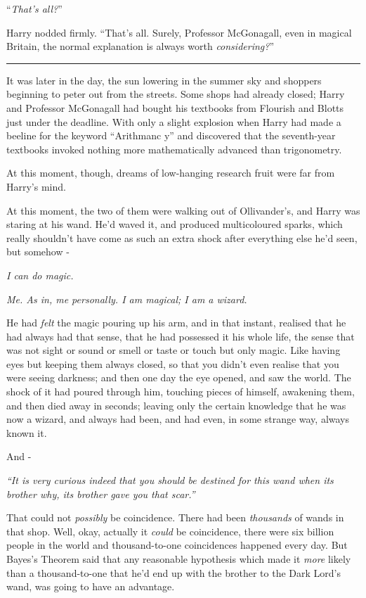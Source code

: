 ``\emph{That's all?}''

Harry nodded firmly. ``That's all. Surely, Professor McGonagall, even in magical Britain, the normal explanation is always worth \emph{considering?}''

\begin{center}\rule{3in}{0.4pt}\end{center}

It was later in the day, the sun lowering in the summer sky and shoppers beginning to peter out from the streets. Some shops had already closed; Harry and Professor McGonagall had bought his textbooks from Flourish and Blotts just under the deadline. With only a slight explosion when Harry had made a beeline for the keyword ``Arithmanc y'' and discovered that the seventh-year textbooks invoked nothing more mathematically advanced than trigonometry.

At this moment, though, dreams of low-hanging research fruit were far from Harry's mind.

At this moment, the two of them were walking out of Ollivander's, and Harry was staring at his wand. He'd waved it, and produced multicoloured sparks, which really shouldn't have come as such an extra shock after everything else he'd seen, but somehow -

\emph{I can do magic.}

\emph{Me. As in, me personally. I am magical; I am a wizard.}

He had \emph{felt} the magic pouring up his arm, and in that instant, realised that he had always had that sense, that he had possessed it his whole life, the sense that was not sight or sound or smell or taste or touch but only magic. Like having eyes but keeping them always closed, so that you didn't even realise that you were seeing darkness; and then one day the eye opened, and saw the world. The shock of it had poured through him, touching pieces of himself, awakening them, and then died away in seconds; leaving only the certain knowledge that he was now a wizard, and always had been, and had even, in some strange way, always known it.

And -

\emph{``It is very curious indeed that you should be destined for this wand when its brother why, its brother gave you that scar.''}

That could not \emph{possibly} be coincidence. There had been \emph{thousands} of wands in that shop. Well, okay, actually it \emph{could} be coincidence, there were six billion people in the world and thousand-to-one coincidences happened every day. But Bayes's Theorem said that any reasonable hypothesis which made it \emph{more} likely than a thousand-to-one that he'd end up with the brother to the Dark Lord's wand, was going to have an advantage.

